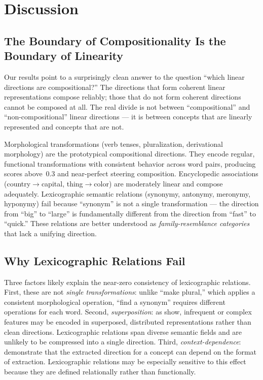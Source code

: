 \section{Discussion}
\label{sec:discussion}

\subsection{The Boundary of Compositionality Is the Boundary of Linearity}

Our results point to a surprisingly clean answer to the question ``which linear directions are compositional?''
The directions that form coherent linear representations compose reliably; those that do not form coherent directions cannot be composed at all.
The real divide is not between ``compositional'' and ``non-compositional'' linear directions --- it is between concepts that are linearly represented and concepts that are not.

Morphological transformations (verb tenses, pluralization, derivational morphology) are the prototypical compositional directions.
They encode regular, functional transformations with consistent behavior across word pairs, producing \loo scores above~0.3 and near-perfect steering composition.
Encyclopedic associations (country$\to$capital, thing$\to$color) are moderately linear and compose adequately.
Lexicographic semantic relations (synonymy, antonymy, meronymy, hyponymy) fail because ``synonym'' is not a single transformation --- the direction from ``big'' to ``large'' is fundamentally different from the direction from ``fast'' to ``quick.''
These relations are better understood as \emph{family-resemblance categories} that lack a unifying direction.

\subsection{Why Lexicographic Relations Fail}

Three factors likely explain the near-zero \loo consistency of lexicographic relations.
First, these are not \emph{single transformations}: unlike ``make plural,'' which applies a consistent morphological operation, ``find a synonym'' requires different operations for each word.
Second, \emph{superposition}: as \citet{elhage2022superposition} show, infrequent or complex features may be encoded in superposed, distributed representations rather than clean directions.
Lexicographic relations span diverse semantic fields and are unlikely to be compressed into a single direction.
Third, \emph{context-dependence}: \citet{opielka2026causality} demonstrate that the extracted direction for a concept can depend on the format of extraction.
Lexicographic relations may be especially sensitive to this effect because they are defined relationally rather than functionally.

